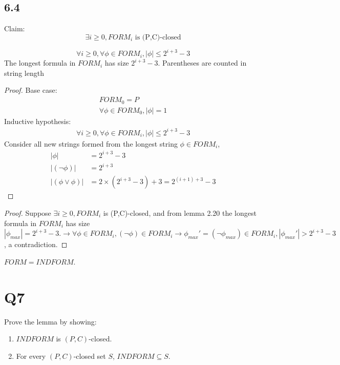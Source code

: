 \documentclass{article}
\newtheorem{lemma}[theorem]{Lemma}
\let\oldlemma\lemma
\let\endoldlemma\endlemma
\renewenvironment{lemma}
  {\begin{tcolorbox}[
      colback=green!8,
      colframe=green!50!black,
      boxrule=0.6pt,
      arc=2pt,
      left=6pt,right=6pt,top=4pt,bottom=4pt
    ]\oldlemma}
  {\endoldlemma\end{tcolorbox}}
\begin{document}
\subsection*{6.4}
Claim: \[\exists i \geq 0, FORM_i \text{ is (P,C)-closed}\]
\begin{lemma}
    \[\forall i \geq 0, \forall \phi \in FORM_i, |\phi| \leq 2^{i+3} - 3\]
    The longest formula in $FORM_i$ has size $2^{i+3}-3$. Parentheses are counted in string length
\end{lemma}
\begin{proof}
    Base case: 
    \begin{align*}
        FORM_0 = P\\
        \forall \phi \in FORM_0, |\phi| = 1
    \end{align*}
    Inductive hypothesis:
    \begin{align*}
        \forall i \geq 0, \forall \phi \in FORM_i, |\phi| \leq 2^{i+3} - 3
    \end{align*}
    Consider all new strings formed from the longest string $\phi \in FORM_i$, 
    \begin{align*}
        |\phi| &= 2^{i+3} - 3\\
        |(\neg \phi)| &= 2^{i+3}\\
        |(\phi \lor \phi)| &=  2\times (2^{i+3} - 3) + 3 = 2^{(i+1)+3} - 3
    \end{align*}
\end{proof}
\begin{proof}

Suppose $\exists i \geq 0, FORM_i $ is (P,C)-closed, and from lemma 2.20 the longest formula in $FORM_i$ has size 
$|\phi_{max}| = 2^{i+3} - 3. \rightarrow \forall \phi \in FORM_i, (\neg \phi) \in FORM_i \rightarrow \phi_{max}' = (\neg \phi_{max}) \in FORM_i, |\phi_{max}'| > 2^{i+3} - 3$, a contradiction.

\end{proof}

\begin{lemma}
    ${FORM} = {INDFORM}$.
    \end{lemma}
\section*{Q7}    
    Prove the lemma by showing:
    \begin{enumerate}
      \item ${INDFORM}$ is $(P,C)$-closed.
      \item For every $(P,C)$-closed set $S$, ${INDFORM} \subseteq S$.
    \end{enumerate}
\end{document}
